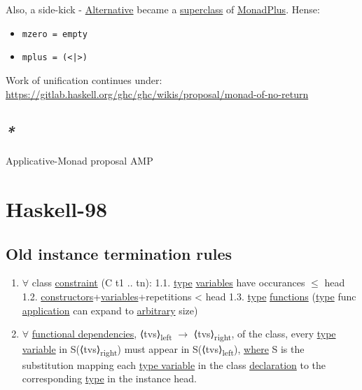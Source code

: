 \documentclass[a4paper,14pt,oneside]{book}
\begin{document}
Also, a side-kick - \hyperref[org2abd54c]{Alternative} became a \hyperref[org89bc43a]{superclass} of \hyperref[orgd6441d4]{MonadPlus}. Hense:
\begin{itemize}
\item \texttt{mzero = empty}
\item \texttt{mplus = (<|>)}
\end{itemize}

Work of unification continues under: \url{https://gitlab.haskell.org/ghc/ghc/wikis/proposal/monad-of-no-return}

\section{\emph{*}}
\label{sec:org4d74003}

\label{org925ffe5}Applicative-Monad proposal
\label{orgc3a1697}AMP

\chapter{Haskell-98}
\label{sec:org10c9fec}

\section{\label{org9cffd5b}Old instance termination rules}
\label{sec:org649ff81}

\begin{enumerate}
\item \(\forall\) class \hyperref[org31f6eb4]{constraint} (C t1 .. tn):
1.1. \hyperref[orga8cd5bc]{type} \hyperref[orgd986c0f]{variables} have occurances \(\le\) head
1.2. \hyperref[orgfff542c]{constructors}+\hyperref[orgd986c0f]{variables}+repetitions < head
1.3. \textlnot{} \hyperref[orga8cd5bc]{type} \hyperref[orgfa3922e]{functions} (\hyperref[orga8cd5bc]{type} func \hyperref[orgc33bda7]{application} can expand to \hyperref[org762db83]{arbitrary} size)
\item \(\forall\) \hyperref[orgefa1e8a]{functional dependencies}, ⟨tvs⟩\textsubscript{left} \(\to\) ⟨tvs⟩\textsubscript{right}, of the class, every \hyperref[org8c7c5bc]{type variable} in S(⟨tvs⟩\textsubscript{right}) must appear in S(⟨tvs⟩\textsubscript{left}), \hyperref[orgede6728]{where} S is the substitution mapping each \hyperref[org8c7c5bc]{type variable} in the class \hyperref[org905face]{declaration} to the corresponding \hyperref[orga8cd5bc]{type} in the instance head.
\end{enumerate}
\end{document}
